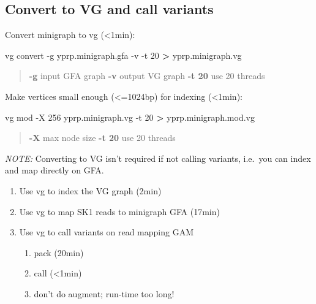 \documentclass[
]{book}
\newenvironment{Shaded}{\begin{snugshade}}{\end{snugshade}}
\newcommand{\AttributeTok}[1]{\textcolor[rgb]{0.77,0.63,0.00}{#1}}
\newcommand{\ExtensionTok}[1]{#1}
\newcommand{\NormalTok}[1]{#1}
\newcommand{\OperatorTok}[1]{\textcolor[rgb]{0.81,0.36,0.00}{\textbf{#1}}}
\providecommand{\tightlist}{%
  \setlength{\itemsep}{0pt}\setlength{\parskip}{0pt}}
\begin{document}
\hypertarget{convert-to-vg-and-call-variants}{%
\subsection*{Convert to VG and call variants}\label{convert-to-vg-and-call-variants}}

Convert minigraph to vg (\textless1min):

\begin{Shaded}
\begin{Highlighting}[]
\ExtensionTok{vg}\NormalTok{ convert }\AttributeTok{{-}g}\NormalTok{ yprp.minigraph.gfa }\AttributeTok{{-}v} \AttributeTok{{-}t}\NormalTok{ 20 }\OperatorTok{\textgreater{}}\NormalTok{ yprp.minigraph.vg}
\end{Highlighting}
\end{Shaded}

\begin{quote}
\textbf{-g} input GFA graph
\textbf{-v} output VG graph
\textbf{-t 20} use 20 threads
\end{quote}

Make vertices small enough (\textless=1024bp) for indexing (\textless1min):

\begin{Shaded}
\begin{Highlighting}[]
\ExtensionTok{vg}\NormalTok{ mod }\AttributeTok{{-}X}\NormalTok{ 256 yprp.minigraph.vg }\AttributeTok{{-}t}\NormalTok{ 20 }\OperatorTok{\textgreater{}}\NormalTok{ yprp.minigraph.mod.vg}
\end{Highlighting}
\end{Shaded}

\begin{quote}
\textbf{-X} max node size
\textbf{-t 20} use 20 threads
\end{quote}

\emph{NOTE:} Converting to VG isn't required if not calling variants, i.e.~you can index and map directly on GFA.

\begin{enumerate}
\def\labelenumi{\arabic{enumi}.}
\tightlist
\item
  Use vg to index the VG graph (2min)
\item
  Use vg to map SK1 reads to minigraph GFA (17min)
\item
  Use vg to call variants on read mapping GAM

  \begin{enumerate}
  \def\labelenumii{\alph{enumii}.}
  \tightlist
  \item
    pack (20min)
  \item
    call (\textless1min)
  \item
    don't do augment; run-time too long!
  \end{enumerate}
\end{enumerate}
\end{document}
